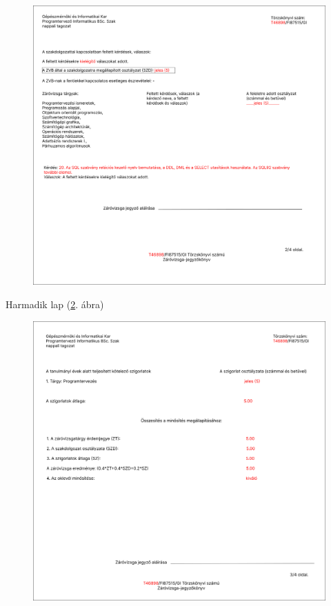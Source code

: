 \documentclass[a4paper,12pt]{article}
\begin{document}
\begin{figure}
	\centering
	\includegraphics[width=\textwidth]{images/Web_pages/Zv_Report2.png}
	\caption{}
	\label{fig:Zv_Report2}
\end{figure}

Harmadik lap (\ref{fig:Zv_Report3}. ábra)

\begin{figure}
	\centering
	\includegraphics[width=\textwidth]{images/Web_pages/Zv_Report3.png}
	\caption{}
	\label{fig:Zv_Report3}
\end{figure}
\end{document}
